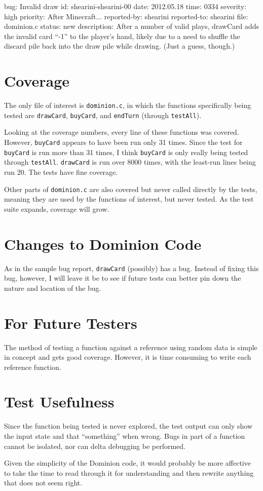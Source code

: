 \documentclass[letterpaper,12pt]{article}
\begin{document}
bug: Invalid draw
id: shearini-shearini-00
date: 2012.05.18
time: 0334
severity: high
priority: After Minecraft...
reported-by: shearini
reported-to: shearini
file: dominion.c
status: new
description: After a number of valid plays, drawCard adds the invalid card
``-1'' to the player's hand, likely due to a need to shuffle the discard pile
back into the draw pile while drawing. (Just a guess, though.)

\section{Coverage}
The only file of interest is {\tt dominion.c}, in which the functions
specifically being tested are {\tt drawCard}, {\tt buyCard}, and {\tt endTurn}
(through {\tt testAll}).

Looking at the coverage numbers, every line of these functions was covered.
However, {\tt buyCard} appears to have been run only 31 times. Since the test
for {\tt buyCard} is run more than 31 times, I think {\tt buyCard} is only
really being tested through {\tt testAll}. {\tt drawCard} is run over 8000
times, with the least-run lines being run 20. The tests have fine coverage.

Other parts of {\tt dominion.c} are also covered but never called directly by
the tests, meaning they are used by the functions of interest, but never
tested. As the test suite expands, coverage will grow.

\section{Changes to Dominion Code}
As in the sample bug report, {\tt drawCard} (possibly) has a bug. Instead of
fixing this bug, however, I will leave it be to see if future tests can better
pin down the nature and location of the bug.

\section{For Future Testers}
The method of testing a function against a reference using random data is
simple in concept and gets good coverage. However, it is time consuming to
write each reference function.

\section{Test Usefulness}
Since the function being tested is never explored, the test output can only
show the input state and that ``something'' when wrong. Bugs in part of a
function cannot be isolated, nor can delta debugging be performed.

Given the simplicity of the Dominion code, it would probably be more affective
to take the time to read through it for understanding and then rewrite anything
that does not seem right.
\end{document}
